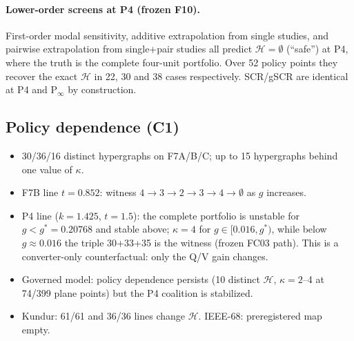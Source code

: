 \documentclass[10pt,a4paper]{article}
\theoremstyle{definition}
\newcommand{\Hy}{\mathcal{H}}
\begin{document}
\paragraph{Lower-order screens at P4 (frozen F10).} First-order modal sensitivity, additive extrapolation
from single studies, and pairwise extrapolation from single+pair studies all predict
$\Hy=\emptyset$ (``safe'') at P4, where the truth is the complete four-unit portfolio. Over 52 policy points
they recover the exact $\Hy$ in 22, 30 and 38 cases respectively. SCR/gSCR are identical at P4 and
P$_\infty$ by construction.

\subsection{Policy dependence (C1)}
\begin{itemize}
\item 30/36/16 distinct hypergraphs on F7A/B/C; up to 15 hypergraphs behind one value of $\kappa$.
\item F7B line $t=0.852$: witness $4\to3\to2\to3\to4\to\emptyset$ as $g$ increases.
\item P4 line ($k=1.425$, $t=1.5$): the complete portfolio is unstable for $g<g^*=0.20768$ and stable above;
$\kappa=4$ for $g\in[0.016,g^*)$, while below $g\approx0.016$ the triple 30+33+35 is the witness (frozen FC03 path).
This is a converter-only counterfactual: only the Q/V gain changes.
\item Governed model: policy dependence persists (10 distinct $\Hy$, $\kappa=2$--4 at 74/399 plane points)
but the P4 coalition is stabilized.
\item Kundur: 61/61 and 36/36 lines change $\Hy$. IEEE-68: preregistered map empty.
\end{itemize}
\end{document}
